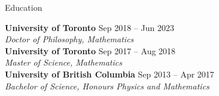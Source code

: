 \documentclass{resume}
\begin{document}
\begin{rSection}{Education}

\textbf{University of Toronto} \hfill {\normalfont Sep 2018 -- Jun 2023} \\
{\normalfont \textit{Doctor of Philosophy, Mathematics}} \\
\textbf{University of Toronto} \hfill {\normalfont Sep 2017 -- Aug 2018} \\
{\normalfont \textit{Master of Science, Mathematics}} \\
\textbf{University of British Columbia} \hfill {\normalfont Sep 2013 -- Apr 2017}\\
{\normalfont \textit{Bachelor of Science, Honours Physics and Mathematics}}

\end{rSection}

\end{document}
